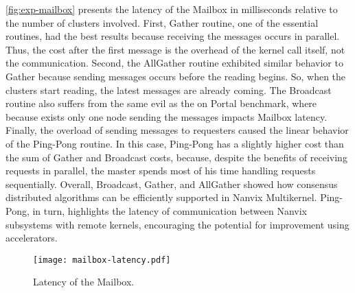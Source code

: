 			\autoref{fig:exp-mailbox} presents the latency of the Mailbox in
			milliseconds relative to the number of clusters involved. First,
			Gather routine, one of the essential routines, had the best results
			because receiving the messages occurs in parallel. Thus, the cost
			after the first message is the overhead of the kernel call itself,
			not the communication. Second, the AllGather routine exhibited similar
			behavior to Gather because sending messages occurs before the reading
			begins. So, when the clusters start reading, the latest messages are
			already coming. The Broadcast routine also suffers from the same evil
			as the on Portal benchmark, where because exists only one node sending
			the messages impacts Mailbox latency. Finally, the overload of sending
			messages to requesters caused the linear behavior of the Ping-Pong
			routine. In this case, Ping-Pong has a slightly higher cost than the
			sum of Gather and Broadcast costs, because, despite the benefits of
			receiving requests in parallel, the master spends most of his time
			handling requests sequentially. Overall, Broadcast, Gather, and
			AllGather showed how consensus distributed algorithms can be
			efficiently supported in Nanvix Multikernel. Ping-Pong, in turn,
			highlights the latency of communication between Nanvix subsystems
			with remote kernels, encouraging the potential for improvement using
			\dma accelerators.

			\begin{figure}[!tb]
				\centering%
				\caption{Latency of the Mailbox.}%
				\label{fig:exp-mailbox}%
				\texttt{[image: mailbox-latency.pdf]}%
			\end{figure}
